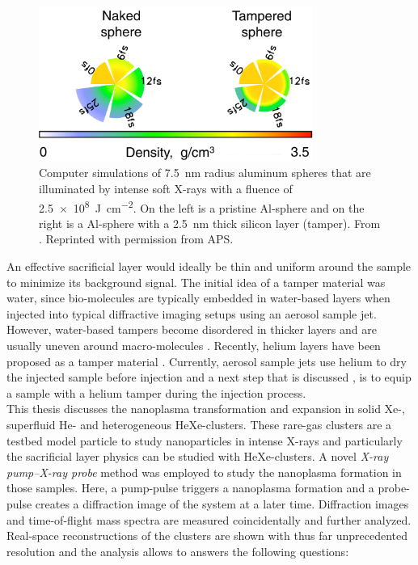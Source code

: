 \begin{figure}
	\centering
		\includegraphics[width=0.80\textwidth]{images/tamper-layer.png}
	\caption[Computer simulations of aluminum spheres with tamper layers]{Computer simulations of \SI{7.5}{\nano\meter} radius aluminum spheres that are illuminated by intense soft X-rays with a fluence of \SI{2.5e8}{\joule\per\square\centi\meter}. On the left is a pristine Al-sphere and on the right is a Al-sphere with a \SI{2.5}{\nano\meter} thick silicon layer (tamper). From \citep{Hau-Riege-2010-PRL}. Reprinted with permission from APS.}
	\label{fig:tamper-layer}
\end{figure}
%
An effective sacrificial layer would ideally be thin and uniform around the sample to minimize its background signal. The initial idea of a tamper material was water, since bio-molecules are typically embedded in water-based layers when injected into typical diffractive imaging setups using an aerosol sample jet. However, water-based tampers become disordered in thicker layers and are usually uneven around macro-molecules \cite{Aquila-2015-StrucDyn}. Recently, helium layers have been proposed as a tamper material \cite{Mikaberidze-2008-PRA}. Currently, aerosol sample jets use helium to dry the injected sample before injection and a next step that is discussed \cite{Bielecki-2016-PC}, is to equip a sample with a helium tamper during the injection process.\\[1\baselineskip]
%
This thesis discusses the nanoplasma transformation and expansion in solid Xe-, superfluid He- and heterogeneous HeXe-clusters. These rare-gas clusters are a testbed model particle to study nanoparticles in intense X-rays \cite{Fennel-2010-RMP} and particularly the sacrificial layer physics can be studied with HeXe-clusters. A novel \textit{X-ray pump--X-ray probe} method was employed to study the nanoplasma formation in those samples. Here, a pump-pulse triggers a nanoplasma formation and a probe-pulse creates a diffraction image of the system at a later time. Diffraction images and time-of-flight mass spectra are measured coincidentally and further analyzed. Real-space reconstructions of the clusters are shown with thus far unprecedented resolution and the analysis allows to answers the following questions:
